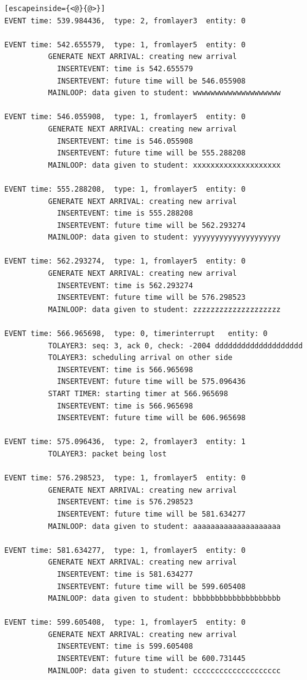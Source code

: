 \documentclass[paper=a4, fontsize=11pt]{scrartcl}
\numberwithin{equation}{section}		%
\numberwithin{figure}{section}			%
\numberwithin{table}{section}				%
\begin{document}
\begin{lstlisting}[escapeinside={<@}{@>}]
EVENT time: 539.984436,  type: 2, fromlayer3  entity: 0

EVENT time: 542.655579,  type: 1, fromlayer5  entity: 0
          GENERATE NEXT ARRIVAL: creating new arrival
            INSERTEVENT: time is 542.655579
            INSERTEVENT: future time will be 546.055908
          MAINLOOP: data given to student: wwwwwwwwwwwwwwwwwwww

EVENT time: 546.055908,  type: 1, fromlayer5  entity: 0
          GENERATE NEXT ARRIVAL: creating new arrival
            INSERTEVENT: time is 546.055908
            INSERTEVENT: future time will be 555.288208
          MAINLOOP: data given to student: xxxxxxxxxxxxxxxxxxxx

EVENT time: 555.288208,  type: 1, fromlayer5  entity: 0
          GENERATE NEXT ARRIVAL: creating new arrival
            INSERTEVENT: time is 555.288208
            INSERTEVENT: future time will be 562.293274
          MAINLOOP: data given to student: yyyyyyyyyyyyyyyyyyyy

EVENT time: 562.293274,  type: 1, fromlayer5  entity: 0
          GENERATE NEXT ARRIVAL: creating new arrival
            INSERTEVENT: time is 562.293274
            INSERTEVENT: future time will be 576.298523
          MAINLOOP: data given to student: zzzzzzzzzzzzzzzzzzzz

EVENT time: 566.965698,  type: 0, timerinterrupt   entity: 0
          TOLAYER3: seq: 3, ack 0, check: -2004 dddddddddddddddddddd
          TOLAYER3: scheduling arrival on other side
            INSERTEVENT: time is 566.965698
            INSERTEVENT: future time will be 575.096436
          START TIMER: starting timer at 566.965698
            INSERTEVENT: time is 566.965698
            INSERTEVENT: future time will be 606.965698

EVENT time: 575.096436,  type: 2, fromlayer3  entity: 1
          TOLAYER3: packet being lost

EVENT time: 576.298523,  type: 1, fromlayer5  entity: 0
          GENERATE NEXT ARRIVAL: creating new arrival
            INSERTEVENT: time is 576.298523
            INSERTEVENT: future time will be 581.634277
          MAINLOOP: data given to student: aaaaaaaaaaaaaaaaaaaa

EVENT time: 581.634277,  type: 1, fromlayer5  entity: 0
          GENERATE NEXT ARRIVAL: creating new arrival
            INSERTEVENT: time is 581.634277
            INSERTEVENT: future time will be 599.605408
          MAINLOOP: data given to student: bbbbbbbbbbbbbbbbbbbb

EVENT time: 599.605408,  type: 1, fromlayer5  entity: 0
          GENERATE NEXT ARRIVAL: creating new arrival
            INSERTEVENT: time is 599.605408
            INSERTEVENT: future time will be 600.731445
          MAINLOOP: data given to student: cccccccccccccccccccc


\end{lstlisting}
\end{document}
